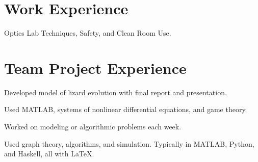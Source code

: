 \documentclass[]{deedy-resume-openfont}
\begin{document}
\hfill
\begin{minipage}[t]{0.55\textwidth} 



\section{Work Experience}

\sectionsep

\sectionsep

\vspace{\topsep} %
\begin{tightemize}
\item Optics Lab Techniques, Safety, and Clean Room Use.
\end{tightemize}
\sectionsep


\section{Team Project Experience}
\vspace{\topsep}
\begin{tightemize}
\item Developed model of lizard evolution with final report
and presentation.
\item Used MATLAB, systems of nonlinear differential equations, and game theory.
\end{tightemize}
\sectionsep

\vspace{\topsep}
\begin{tightemize}
\item Worked on modeling or algorithmic problems each week.
\item Used graph theory, algorithms, and simulation. Typically in MATLAB,
Python, and Haskell, all with \LaTeX.
\end{tightemize}
\sectionsep


\end{minipage}
\end{document}
